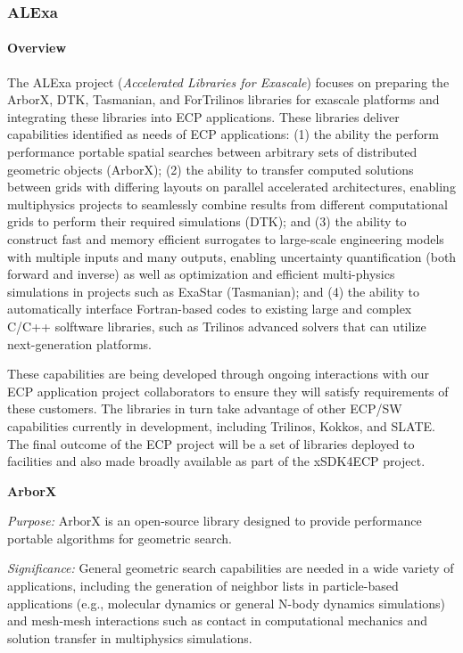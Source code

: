 \subsubsection{ ALExa}


\paragraph{Overview}

The ALExa project ({\sl Accelerated Libraries for Exascale}) focuses on
preparing the ArborX, DTK, Tasmanian, and ForTrilinos libraries for exascale
platforms and integrating these libraries into ECP applications.
These libraries deliver capabilities identified as needs of ECP applications:
%
(1) the ability the perform performance portable spatial searches between
arbitrary sets of distributed geometric objects (ArborX);
%
(2) the ability to transfer computed
solutions between grids with differing layouts on parallel accelerated
architectures, enabling multiphysics projects to seamlessly combine results
from different computational grids to perform their required simulations
(DTK); and
%
(3) the ability to construct fast and memory efficient surrogates to
large-scale engineering models with multiple inputs and many outputs,
enabling uncertainty quantification (both forward and inverse) as well as
optimization and efficient multi-physics simulations in projects such as
ExaStar (Tasmanian); and
%
(4) the ability to automatically interface Fortran-based codes to existing
large and complex C/C++ solftware libraries, such as Trilinos advanced solvers
that can utilize next-generation platforms.


These capabilities are being developed through ongoing interactions with our
ECP application project collaborators to ensure they will satisfy requirements
of these customers.  The libraries in turn take advantage of other ECP/SW
capabilities currently in development, including Trilinos,
Kokkos, and SLATE.  The final outcome of the ECP project will be a set of
libraries deployed to facilities and also made broadly available as part of
the xSDK4ECP project.


{\bf ArborX}

{\it Purpose:} ArborX is an open-source library designed to provide
performance portable algorithms for geometric search.

{\it Significance:} General geometric search capabilities are needed in a wide
variety of applications, including the generation of neighbor lists in
particle-based applications (e.g., molecular dynamics or general N-body
dynamics simulations) and mesh-mesh interactions such as contact in
computational mechanics and solution transfer in multiphysics simulations.

